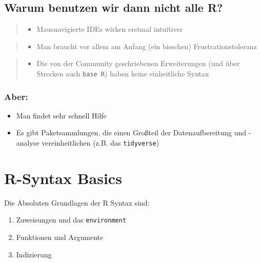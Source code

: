 \documentclass[
]{book}
\providecommand{\tightlist}{%
  \setlength{\itemsep}{0pt}\setlength{\parskip}{0pt}}
\begin{document}
\hypertarget{warum-benutzen-wir-dann-nicht-alle-r}{%
\subsection{Warum benutzen wir dann nicht alle R?}\label{warum-benutzen-wir-dann-nicht-alle-r}}

\begin{quote}
\begin{itemize}
\tightlist
\item
  Mausnavigierte IDEs wirken erstmal intuitiver
\end{itemize}
\end{quote}

\begin{quote}
\begin{itemize}
\tightlist
\item
  Man braucht vor allem am Anfang (ein bisschen) Frustrationstoleranz
\end{itemize}
\end{quote}

\begin{quote}
\begin{itemize}
\tightlist
\item
  Die von der Community geschriebenen Erweiterungen (und über Strecken auch \texttt{base\ R}) haben keine einheitliche Syntax
\end{itemize}
\end{quote}

\hypertarget{aber}{%
\subsubsection{Aber:}\label{aber}}

\begin{itemize}
\item
  Man findet sehr schnell Hilfe
\item
  Es gibt Paketsammlungen, die einen Großteil der Datenaufbereitung und -analyse vereinheitlichen (z.B. das \texttt{tidyverse})
\end{itemize}

\hypertarget{r-syntax-basics}{%
\section{R-Syntax Basics}\label{r-syntax-basics}}

Die Absoluten Grundlagen der R Syntax sind:

\begin{enumerate}
\def\labelenumi{\arabic{enumi}.}
\item
  Zuweisungen und das \texttt{environment}
\item
  Funktionen und Argumente
\item
  Indizierung
\end{enumerate}
\end{document}
